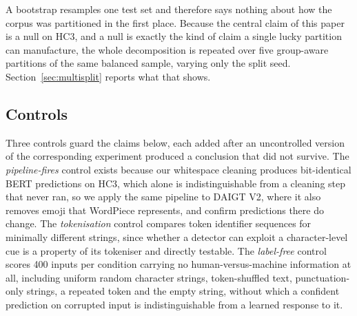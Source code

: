 A bootstrap resamples one test set and therefore says nothing about how the corpus was partitioned in the first place. Because the central claim of this paper is a null on HC3, and a null is exactly the kind of claim a single lucky partition can manufacture, the whole decomposition is repeated over five group-aware partitions of the same balanced sample, varying only the split seed. Section~\ref{sec:multisplit} reports what that shows.

\subsection{Controls}
\label{sec:controls}

Three controls guard the claims below, each added after an uncontrolled version of the corresponding experiment produced a conclusion that did not survive. The \emph{pipeline-fires} control exists because our whitespace cleaning produces bit-identical BERT predictions on HC3, which alone is indistinguishable from a cleaning step that never ran, so we apply the same pipeline to DAIGT V2, where it also removes emoji that WordPiece represents, and confirm predictions there do change. The \emph{tokenisation} control compares token identifier sequences for minimally different strings, since whether a detector can exploit a character-level cue is a property of its tokeniser and directly testable. The \emph{label-free} control scores 400 inputs per condition carrying no human-versus-machine information at all, including uniform random character strings, token-shuffled text, punctuation-only strings, a repeated token and the empty string, without which a confident prediction on corrupted input is indistinguishable from a learned response to it.